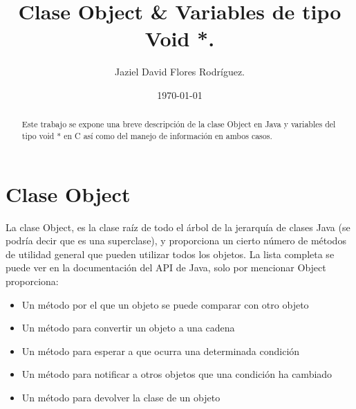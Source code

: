 \documentclass[12pt ]{article}
\author{Jaziel David Flores Rodríguez.}
\date{\today}
\title{Clase Object \& Variables de tipo Void *.}
\begin{document}
\maketitle

\begin{abstract}
        Este trabajo se expone una breve descripción de la clase Object en Java y variables del tipo void * en C así como del manejo de información en ambos casos.
\end{abstract}
\section{Clase Object}

La clase Object, es la clase raíz de todo el árbol de la jerarquía de clases Java (se podría decir que es una superclase), y proporciona un cierto número de métodos de utilidad general que pueden utilizar todos los objetos. La lista completa se puede ver en la documentación del API de Java, solo por mencionar Object proporciona:
\begin{itemize}
        \item Un método por el que un objeto se puede comparar con otro objeto
        \item Un método para convertir un objeto a una cadena
         \item Un método para esperar a que ocurra una determinada condición
        \item Un método para notificar a otros objetos que una condición ha cambiado
        \item Un método para devolver la clase de un objeto
\end{itemize}
\pagebreak
\end{document}
